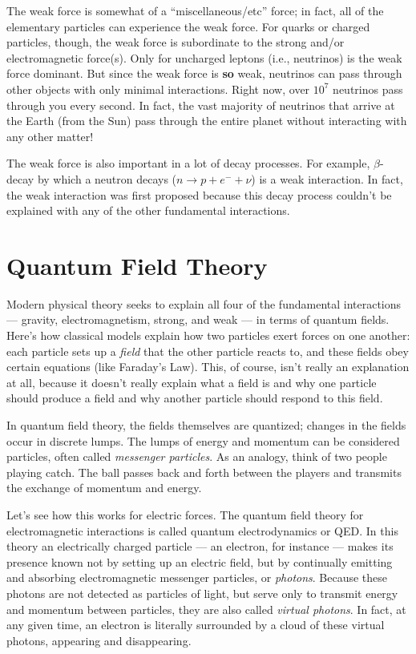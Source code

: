 The weak force is somewhat of a ``miscellaneous/etc'' force; in
fact, all of the elementary particles can experience the weak
force.  For quarks or charged particles, though, the weak force is
subordinate to the strong and/or electromagnetic force(s).  Only
for uncharged leptons (i.e., neutrinos) is the weak force
dominant.  But since the weak force is {\bf so} weak, neutrinos
can pass through other objects with only minimal interactions.
Right now, over $10^7$ neutrinos pass through you every second. In
fact, the vast majority of neutrinos that arrive at the Earth
(from the Sun) pass through the entire planet without interacting
with any other matter!

The weak force is also important in a lot of decay processes. For
example, $\beta$-decay by which a neutron decays ($n \rightarrow p
+ e^- + \nu$) is a weak interaction.  In fact, the weak
interaction was first proposed because this decay process couldn't
be explained with any of the other fundamental interactions.

\section{Quantum Field Theory}
\label{sec:quantum_field_theory}

Modern physical theory seeks to explain all four of the
fundamental interactions --- gravity, electromagnetism, strong,
and weak --- in terms of quantum fields.  Here's how classical
models explain how two particles exert forces on one another: each
particle sets up a {\em field} that the other particle reacts to,
and these fields obey certain equations (like Faraday's Law).
This, of course, isn't really an explanation at all, because it
doesn't really explain what a field is and why one particle should
produce a field and why another particle should respond to this
field.

In quantum field theory, the fields themselves are quantized;
changes in the fields occur in discrete lumps.  The lumps of
energy and momentum can be considered particles, often called {\em
messenger particles}.  As an analogy, think of two people playing
catch.  The ball passes back and forth between the players and
transmits the exchange of momentum and energy.

Let's see how this works for electric forces.  The quantum field
theory for electromagnetic interactions is called quantum
electrodynamics or QED.  In this theory an electrically charged
particle --- an electron, for instance --- makes its presence
known not by setting up an electric field, but by continually
emitting and absorbing electromagnetic messenger particles, or
{\em photons}. Because these photons are not detected as particles
of light, but serve only to transmit energy and momentum between
particles, they are also called {\em virtual photons}.  In fact,
at any given time, an electron is literally surrounded by a cloud
of these virtual photons, appearing and disappearing.

